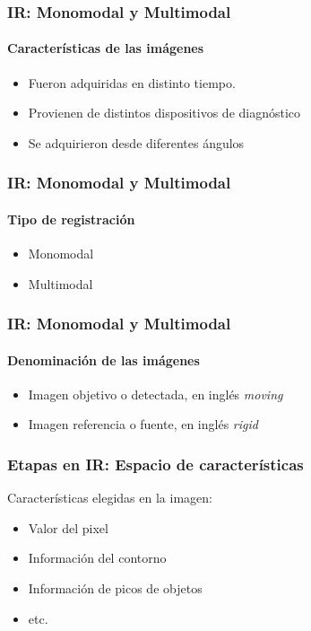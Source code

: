 \documentclass{beamer} %
\begin{document}
\begin{frame}
\frametitle{IR: Monomodal y Multimodal}
\framesubtitle{Características de las imágenes}

\begin{itemize}
\pause
\item Fueron adquiridas en distinto tiempo.
\pause
\item Provienen de distintos dispositivos de diagnóstico
\pause
\item Se adquirieron desde diferentes ángulos
\end{itemize}

\end{frame}

\begin{frame}
\frametitle{IR: Monomodal y Multimodal}
\framesubtitle{Tipo de registración}

\begin{itemize}
\pause
\item Monomodal
\pause
\item Multimodal
\end{itemize}

\end{frame}

\begin{frame}
\frametitle{IR: Monomodal y Multimodal}
\framesubtitle{Denominación de las imágenes}

\begin{itemize}
\pause
\item Imagen objetivo o detectada, en inglés \textit{moving}
\pause
\item Imagen referencia o fuente, en inglés \textit{rigid}
\end{itemize}

\end{frame}

\begin{frame}
\frametitle{Etapas en IR: Espacio de características}

Características elegidas en la imagen:

\pause
\begin{itemize}
\item Valor del pixel
\item Información del contorno
\item Información de picos de objetos
\item etc.
\end{itemize}

\end{frame}
\end{document}
